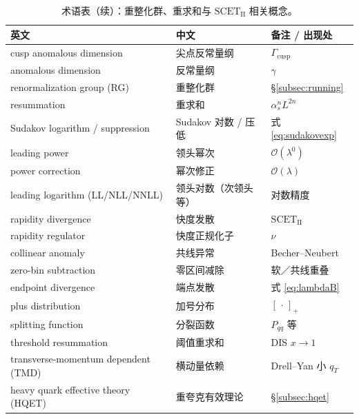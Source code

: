 \documentclass[UTF8,a4paper,11pt]{ctexart}
\theoremstyle{definition}
\theoremstyle{remark}
\theoremstyle{plain}
\newcommand{\as}{\alpha_s}
\newcommand{\Gcusp}{\Gamma_{\mathrm{cusp}}}
\newcommand{\SCETII}{\text{SCET}_{\mathrm{II}}}
\begin{document}
\begin{table}[htbp]
\centering
\caption{术语表（续）：重整化群、重求和与 $\SCETII$ 相关概念。}
\label{tab:terms3}
\begin{tabular}{@{}lll@{}}
\toprule
英文 & 中文 & 备注 / 出现处 \\
\midrule
cusp anomalous dimension          & 尖点反常量纲        & $\Gcusp$ \\
anomalous dimension               & 反常量纲            & $\gamma$ \\
renormalization group (RG)        & 重整化群            & \S\ref{subsec:running} \\
resummation                       & 重求和              & $\as^nL^{2n}$ \\
Sudakov logarithm / suppression   & Sudakov 对数 / 压低 & 式 \eqref{eq:sudakovexp} \\
leading power                     & 领头幂次            & $\mathcal O(\lambda^0)$ \\
power correction                  & 幂次修正            & $\mathcal O(\lambda)$ \\
leading logarithm (LL/NLL/NNLL)   & 领头对数（次领头等）& 对数精度 \\
rapidity divergence               & 快度发散            & $\SCETII$ \\
rapidity regulator                & 快度正规化子        & $\nu$ \\
collinear anomaly                 & 共线异常            & Becher--Neubert \\
zero-bin subtraction              & 零区间减除          & 软／共线重叠 \\
endpoint divergence               & 端点发散            & 式 \eqref{eq:lambdaB} \\
plus distribution                 & 加号分布            & $[\,\cdot\,]_+$ \\
splitting function                & 分裂函数            & $P_{qq}$ 等 \\
threshold resummation             & 阈值重求和          & DIS $x\to1$ \\
transverse-momentum dependent (TMD) & 横动量依赖        & Drell--Yan 小 $q_T$ \\
heavy quark effective theory (HQET) & 重夸克有效理论    & \S\ref{subsec:hqet} \\
\bottomrule
\end{tabular}
\end{table}

\end{document}
